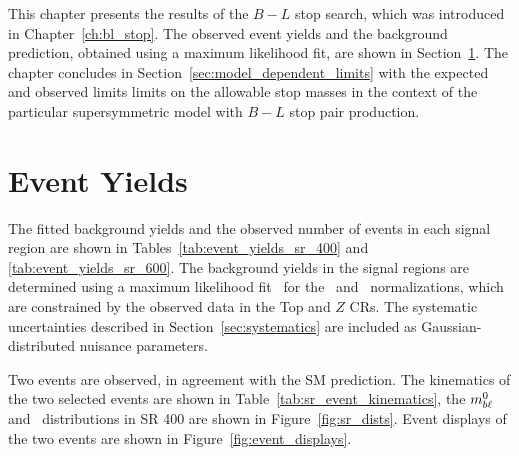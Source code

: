 This chapter presents the results of the $B-L$ stop search, which was
introduced in Chapter~\ref{ch:bl_stop}.
The observed event yields and the background prediction, obtained using a
maximum likelihood fit, are shown in Section~\ref{sec:event_yields}.
The chapter concludes in Section~\ref{sec:model_dependent_limits} with the
expected and observed limits limits on the allowable stop masses in the
context of the particular supersymmetric model with $B-L$ stop pair production.

\FloatBarrier
\section[Event yields][Event yields]{Event Yields}
\label{sec:event_yields}

The fitted background yields and the observed number of events in each
signal region are shown in Tables~\ref{tab:event_yields_sr_400} and
\ref{tab:event_yields_sr_600}.
The background yields in the signal regions are determined using a maximum
likelihood fit~\cite{Baak:2014wma} for the \TTBAR\ and
\ZGAMMAJETS\ normalizations, which are constrained by the observed data in the
Top and $Z$ CRs.
The systematic uncertainties described in Section~\ref{sec:systematics} are
included as Gaussian-distributed nuisance parameters.

Two events are observed, in agreement with the SM prediction.
The kinematics of the two selected events are shown in
Table~\ref{tab:sr_event_kinematics}, the $m_{b\ell}^0$ and \HT\ distributions in
SR 400 are shown in Figure~\ref{fig:sr_dists}.
Event displays of the two events are shown in Figure~\ref{fig:event_displays}.

